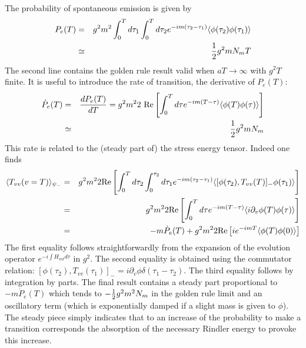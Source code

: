 The probability of
spontaneous emission is given by
 \begin{eqnarray}
P_{e}(T) &=& g^2 m^2 \int_0^T d\tau_1 \int_0^T d\tau_2
e^{-im(\tau_2 - \tau_1)}
\mbox{$ \langle \phi(\tau_2)\phi(\tau_1) \rangle $} \nonumber\\ &\simeq& {1 \over 2} g^2 m  N_m
T
\label{rayvi}
\end{eqnarray}
The second line contains the golden rule result valid when
$aT\to \infty$ with $g^2 T$ finite. It is useful to
introduce the rate of transition, the derivative of $P_{e}(T)$:
\begin{eqnarray}
\dot P_{e}(T) &=& {d P_{e}(T) \over dT}
= g^2 m^2 2 \mbox{ Re} \left[
\int_0^T d\tau e^{-im(T-\tau)} \mbox{$ \langle \phi(T)\phi(\tau) \rangle $}\right] \nonumber\\
&\simeq& {1 \over 2} g^2 m N_m
\label{rayvii}
\end{eqnarray}
This rate is related to the (steady part of) the
stress energy tensor. Indeed one finds
\begin{eqnarray}
\langle T_{vv}(v
=T)\rangle_{\psi_-} &=&
g^2 m^2 2 \mbox{Re} \left[ \int_0^T d\tau_2
\int_0^{\tau_2} d\tau_1 e^{-im(\tau_2 - \tau_1)} \mbox{$ \langle  [\phi(\tau_2) ,
T_{vv}(T) ]_- \phi(\tau_1) \rangle $}\right] \nonumber\\ &=& g^2 m^2 2 \mbox{Re}  \left[
\int_0^T d\tau e^{-im(T-\tau)} \mbox{$ \langle i \partial_v \phi(T) \phi(\tau) \rangle $}\right]
\nonumber\\ &=& - m \dot P_{e}(T) + g^2m^2 2 \mbox{Re}  \left[ i e^{-imT} \mbox{$ \langle 
\phi(T) \phi(0) \rangle $}\right]
\label{rayviii}\end{eqnarray}
 The first equality follows
straightforwardly from the expansion of the evolution operator $e^{-i\!
\int\! H_{int} d \tau}$ in $g^2$. The second equality is obtained using
the commutator relation:
$[\phi(\tau_2) , T_{vv}(\tau_1) ]_- = i \partial_v \phi \delta (\tau_1 -
\tau_2)$. The third equality follows by
integration by parts. The final result
contains a steady part proportional to $- m \dot P_{e}(T)$ which
 tends  to $-{1
\over 2} g^2 m^2 N_m$ in the golden rule limit and an oscillatory term
(which is exponentially damped if a slight mass is given to $ \phi$). The
steady piece simply indicates that to an increase of the probability
 to make a
transition corresponds the absorption of the necessary Rindler energy to
provoke this increase.

